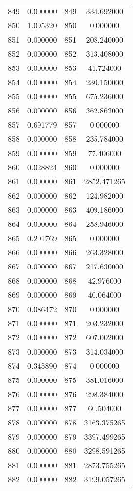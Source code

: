 \documentclass[12pt]{article}
\begin{document}
\begin{longtable}{@{}cccc@{}}
849 & 0.000000 & 849 & 334.692000 \\
850 & 1.095320 & 850 & 0.000000 \\
851 & 0.000000 & 851 & 208.240000 \\
852 & 0.000000 & 852 & 313.408000 \\
853 & 0.000000 & 853 & 41.724000 \\
854 & 0.000000 & 854 & 230.150000 \\
855 & 0.000000 & 855 & 675.236000 \\
856 & 0.000000 & 856 & 362.862000 \\
857 & 0.691779 & 857 & 0.000000 \\
858 & 0.000000 & 858 & 235.784000 \\
859 & 0.000000 & 859 & 77.406000 \\
860 & 0.028824 & 860 & 0.000000 \\
861 & 0.000000 & 861 & 2852.471265 \\
862 & 0.000000 & 862 & 124.982000 \\
863 & 0.000000 & 863 & 409.186000 \\
864 & 0.000000 & 864 & 258.946000 \\
865 & 0.201769 & 865 & 0.000000 \\
866 & 0.000000 & 866 & 263.328000 \\
867 & 0.000000 & 867 & 217.630000 \\
868 & 0.000000 & 868 & 42.976000 \\
869 & 0.000000 & 869 & 40.064000 \\
870 & 0.086472 & 870 & 0.000000 \\
871 & 0.000000 & 871 & 203.232000 \\
872 & 0.000000 & 872 & 607.002000 \\
873 & 0.000000 & 873 & 314.034000 \\
874 & 0.345890 & 874 & 0.000000 \\
875 & 0.000000 & 875 & 381.016000 \\
876 & 0.000000 & 876 & 298.384000 \\
877 & 0.000000 & 877 & 60.504000 \\
878 & 0.000000 & 878 & 3163.375265 \\
879 & 0.000000 & 879 & 3397.499265 \\
880 & 0.000000 & 880 & 3298.591265 \\
881 & 0.000000 & 881 & 2873.755265 \\
882 & 0.000000 & 882 & 3199.057265 \\

\end{longtable}
\end{document}
